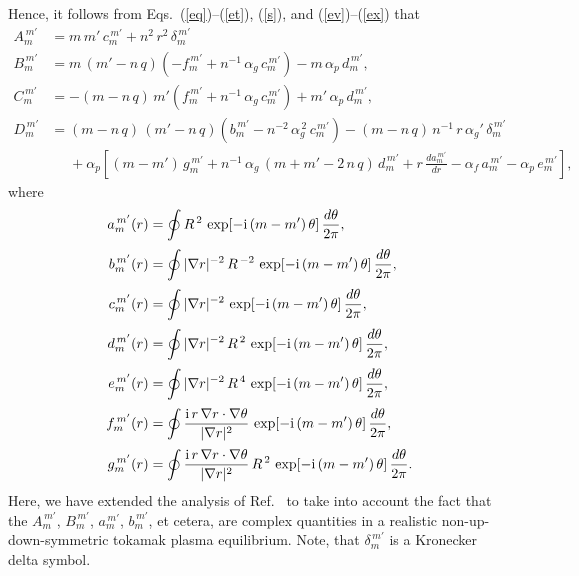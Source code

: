 \documentclass[12pt,prb,aps]{revtex4-1}
\begin{document}
Hence, it follows from Eqs.~(\ref{eq})--(\ref{et}), (\ref{s}), and (\ref{ev})--(\ref{ex}) that\,\cite{am3}
\begin{align}\label{e104}
A_m^{\,m'}&= m\,m'\,c_m^{\,m'} + n^2\,r^2\,\delta_m^{\,m'}\\[0.5ex]
B_m^{\,m'}&= m\,(m'-n\,q)\left(-f_m^{\,m'}+n^{-1}\,\alpha_g\,c_m^{\,m'}\right) -m\,\alpha_p\,d_m^{\,m'},\\[0.5ex]
C_m^{\,m'}&= -(m-n\,q)\,m'\left(f_m^{\,m'}+n^{-1}\,\alpha_g\,c_m^{\,m'}\right)+m'\,\alpha_p\,d_m^{\,m'},\\[0.5ex]
D_m^{\,m'}&= (m-n\,q)\,(m'-n\,q)\left(b_m^{\,m'}-n^{-2}\,\alpha_g^{\,2}\,c_m^{\,m'}\right) - (m-n\,q)\,n^{-1}\,r\,\alpha_g'\,\delta_m^{\,m'}\label{e107}\\[0.5ex]
&\phantom{=} + 
\alpha_p\left[(m-m')\,g_m^{\,m'}+n^{-1}\,\alpha_g\,(m+m'-2\,n\,q)\,d_m^{\,m'} + r\,\frac{d a_m^{\,m'}}{dr}-\alpha_f\,a_m^{\,m'}
-\alpha_p\,e_m^{\,m'}\right],\nonumber
\end{align}
where
\begin{align}\label{e108}
a_m^{\,m'}(r) &= \oint R^{\,2}\,\exp[-{\rm i}\,(m-m')\,\theta]\,\frac{d\theta}{2\pi},\\[0.5ex]
b_m^{\,m'}(r) &= \oint |\nabla r|^{-2}\,R^{\,-2}\,\exp[-{\rm i}\,(m-m')\,\theta]\,\frac{d\theta}{2\pi},\\[0.5ex]
c_m^{\,m'}(r) &= \oint |\nabla r|^{-2}\,\exp[-{\rm i}\,(m-m')\,\theta]\,\frac{d\theta}{2\pi},\\[0.5ex]
d_m^{\,m'}(r) &= \oint |\nabla r|^{-2}\,R^{\,2}\,\exp[-{\rm i}\,(m-m')\,\theta]\,\frac{d\theta}{2\pi},\\[0.5ex]
e_m^{\,m'}(r) &= \oint |\nabla r|^{-2}\,R^{\,4}\,\exp[-{\rm i}\,(m-m')\,\theta]\,\frac{d\theta}{2\pi},\\[0.5ex]
f_m^{\,m'}(r) &= \oint \frac{{\rm i}\,r\,\nabla r\cdot\nabla\theta}{|\nabla r|^2}\,\exp[-{\rm i}\,(m-m')\,\theta]\,\frac{d\theta}{2\pi},\label{fdef}\\[0.5ex]
g_m^{\,m'}(r) &= \oint \frac{{\rm i}\,r\,\nabla r\cdot\nabla\theta}{|\nabla r|^2}\,R^{\,2}\,\exp[-{\rm i}\,(m-m')\,\theta]\,\frac{d\theta}{2\pi}.\label{e114}
\end{align}
Here, we have extended the analysis of Ref.~ to take into account the fact that the $A_m^{\,m'}$, $B_m^{\,m'}$, $a_m^{\,m'}$, $b_m^{\,m'}$, et cetera,
are complex quantities in a realistic non-up-down-symmetric tokamak plasma equilibrium.  Note, that $\delta_m^{\,m'}$ is a Kronecker delta symbol.

 
\end{document}
